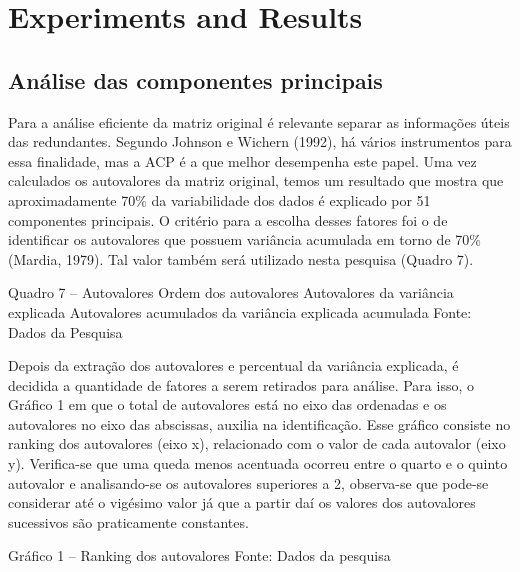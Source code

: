 \section{Experiments and Results}
\label{sec:experimentalresults}

\subsection{Análise das componentes principais}

Para a análise eficiente da matriz original  é relevante separar as informações úteis das redundantes. Segundo Johnson e Wichern (1992), há vários instrumentos para essa finalidade, mas a ACP é a que melhor desempenha este papel. 
Uma vez calculados os autovalores da matriz original, temos um resultado que mostra que aproximadamente 70\% da variabilidade dos dados é explicado por 51 componentes principais. O critério para a escolha desses fatores foi o de identificar os autovalores que possuem variância acumulada em torno de 70\% (Mardia, 1979). Tal valor também será utilizado nesta pesquisa (Quadro 7). 

 Quadro 7 – Autovalores  Ordem dos autovalores  Autovalores da variância explicada Autovalores acumulados da variância explicada acumulada
Fonte: Dados da Pesquisa

Depois da extração dos autovalores e percentual da variância explicada, é decidida a quantidade de fatores a serem retirados para análise. Para isso, o Gráfico 1 em que o total de autovalores está no eixo das ordenadas e os autovalores  no eixo das abscissas, auxilia na identificação. Esse gráfico consiste no ranking dos autovalores (eixo x), relacionado com o valor de cada autovalor (eixo y). Verifica-se que uma queda menos acentuada ocorreu entre o quarto e o quinto autovalor e analisando-se os autovalores superiores a 2, observa-se que pode-se considerar até o vigésimo valor já que a partir daí os valores dos autovalores sucessivos são praticamente constantes.
 
Gráfico 1 – Ranking dos autovalores
Fonte: Dados da pesquisa

